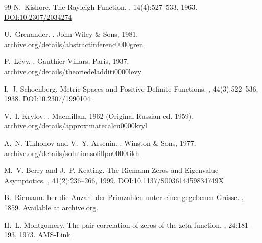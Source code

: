 \documentclass{article}
\numberwithin{equation}{section}
\theoremstyle{plain}
\theoremstyle{definition}
\theoremstyle{remark}
\begin{document}
\begin{thebibliography}{99}
N.~Kishore.
\newblock The Rayleigh Function.
, 14(4):527--533, 1963.
\href{https://doi.org/10.2307/2034274}{DOI:10.2307/2034274}

U.~Grenander.
.
\newblock John Wiley \& Sons, 1981.
\href{https://archive.org/details/abstractinferenc0000gren}{archive.org/details/abstractinferenc0000gren}

P.~L{\'e}vy.
.
\newblock Gauthier-Villars, Paris, 1937.
\href{https://archive.org/details/theoriedeladditi0000levy}{archive.org/details/theoriedeladditi0000levy}

I.~J. Schoenberg.
\newblock Metric Spaces and Positive Definite Functions.
, 44(3):522--536, 1938.
\href{https://doi.org/10.2307/1990104}{DOI:10.2307/1990104}

V.~I. Krylov.
.
\newblock Macmillan, 1962 (Original Russian ed. 1959).
\href{https://archive.org/details/approximatecalcu0000kryl}{archive.org/details/approximatecalcu0000kryl}

A.~N. Tikhonov and V.~Y. Arsenin.
.
\newblock Winston \& Sons, 1977.
\href{https://archive.org/details/solutionsofillpo0000tikh}{archive.org/details/solutionsofillpo0000tikh}

M.~V. Berry and J.~P. Keating.
\newblock The Riemann Zeros and Eigenvalue Asymptotics.
, 41(2):236--266, 1999.
\href{https://doi.org/10.1137/S003614459834749X}{DOI:10.1137/S003614459834749X}

B.~Riemann.
ber die Anzahl der Primzahlen unter einer gegebenen Gr{\"o}sse.
, 1859.
\newblock \href{https://archive.org/details/monatsberichte-der-koniglichen-preussischen-akademie-der-wissenschaften-zu-berlin-1859}{Available at archive.org}.

H.~L. Montgomery.
\newblock The pair correlation of zeros of the zeta function.
, 24:181--193, 1973.
\href{https://www.ams.org/books/pspum/024/0337821/}{AMS-Link}


\end{thebibliography}
\end{document}

